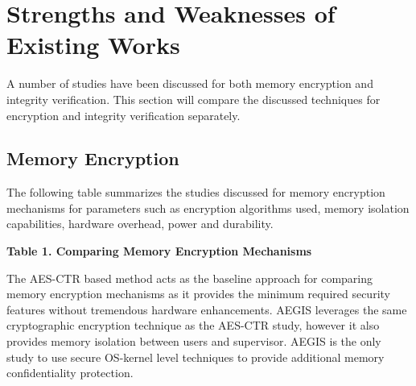 \section{Strengths and Weaknesses of Existing Works}
\label{sec-discussions}

A number of studies have been discussed for both memory encryption and
integrity verification. This section will compare the discussed techniques for
encryption and integrity verification separately.

\subsection{Memory Encryption}
The following table summarizes the studies discussed for memory encryption
mechanisms \cite{suh-memIntEnc, aegis, gcmMem, duece} for parameters such as
encryption algorithms used, memory isolation capabilities, hardware overhead,
power and durability.

\begin{center}
    \textbf{Table 1. Comparing Memory Encryption Mechanisms}
\end{center}
The AES-CTR based method \cite{suh-memIntEnc} acts as the baseline approach for
comparing memory encryption mechanisms as it provides the minimum required
security features without tremendous hardware enhancements. AEGIS \cite{aegis}
leverages the same cryptographic encryption technique as the AES-CTR
\cite{suh-memIntEnc} study, however it also provides memory isolation between
users and supervisor. AEGIS is the only study to use secure OS-kernel level
techniques to provide additional memory confidentiality protection.

